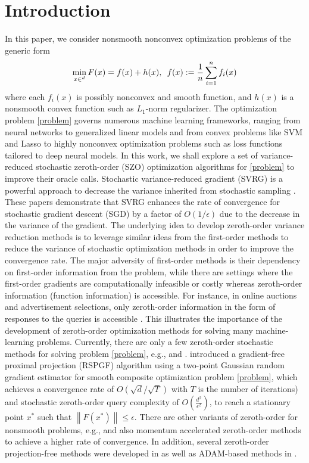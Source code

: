 \documentclass[iicol,sn-basic]{sn-jnl}
\theoremstyle{thmstyleone}%
\theoremstyle{thmstyletwo}%
\theoremstyle{thmstylethree}%
\let\R\relax
\newcommand*{\R}{\mathbb{R}}
\newcommand{\norm}[1]{\left\lVert#1\right\rVert}
\begin{document}
\section{Introduction}
In this paper, we consider nonsmooth nonconvex optimization problems of the generic form
\begin{equation}\label{problem}
\min_{x\in\R^d} F(x) =  f(x) + h(x),\,\,\,f(x):=\frac{1}{n}\sum_{i=1}^n f_i(x)
\end{equation}
where each $f_i(x)$ is possibly nonconvex and smooth function, and $h(x)$ is a nonsmooth convex function such as $L_1$-norm regularizer. 
The optimization problem \eqref{problem} governs
numerous machine learning frameworks, ranging from neural networks to  generalized linear models and from convex problems like SVM and Lasso to highly nonconvex optimization problems such as loss functions tailored to deep neural models. In this work, we shall explore a set of variance-reduced stochastic zeroth-order (SZO) optimization algorithms for \eqref{problem} to improve their oracle calls. Stochastic variance-reduced gradient (SVRG) is a powerful approach to decrease the variance inherited from stochastic sampling \cite{johnson2013accelerating,reddi2016stochastic,nitanda2016accelerated,allen2016improved}. These papers demonstrate that SVRG enhances the rate of convergence for stochastic gradient descent (SGD) by a factor of $O(1/{\epsilon})$ due to the decrease in the variance of the gradient. The underlying idea to develop zeroth-order variance reduction methods is to leverage similar ideas from the first-order methods to reduce the variance of stochastic optimization methods in order to improve the convergence rate. The major adversity of first-order methods is their dependency on first-order information from the problem, while there are settings where the first-order gradients are computationally infeasible or costly whereas zeroth-order information (function information) is accessible. For instance, in online auctions and advertisement
selections, only zeroth-order information in the form of responses to the queries is accessible \cite{wibisono2012finite}. This illustrates the importance of the development of zeroth-order optimization methods for solving many machine-learning problems. Currently, there are only a few zeroth-order stochastic methods
for solving problem \eqref{problem}, e.g., \cite{ghadimi2016mini} and \cite{huang2019faster}. \cite{ghadimi2016mini} introduced a gradient-free proximal projection (RSPGF) algorithm using a two-point Gaussian random gradient estimator for smooth composite optimization problem \eqref{problem}, which achieves a convergence rate of
$O(\sqrt{d}/\sqrt{T})$ with $T$ is the number of iterations) and stochastic zeroth-order query complexity of $O(\frac{d^2}{\epsilon^2})$, to reach a stationary point $x^*$ such that $\norm{F(x^*)} \leq \epsilon$. There are other variants of zeroth-order for nonsmooth problems, e.g., \cite{huang2019faster} and also momentum accelerated zeroth-order methods \cite{chen2019zo} to achieve a higher rate of convergence. In addition, several zeroth-order projection-free methods were developed in \cite{sahu2019towards, huang2020accelerated} as well as ADAM-based methods in \cite{gao2018information}.
\end{document}
